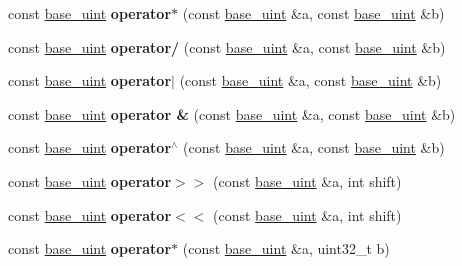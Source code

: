\begin{DoxyCompactItemize}
const \mbox{\hyperlink{classbase__uint}{base\+\_\+uint}} {\bfseries operator$\ast$} (const \mbox{\hyperlink{classbase__uint}{base\+\_\+uint}} \&a, const \mbox{\hyperlink{classbase__uint}{base\+\_\+uint}} \&b)
\item 
\mbox{\label{classbase__uint_a3027097ea3718db496e486d5c64a6bbd}} 
const \mbox{\hyperlink{classbase__uint}{base\+\_\+uint}} {\bfseries operator/} (const \mbox{\hyperlink{classbase__uint}{base\+\_\+uint}} \&a, const \mbox{\hyperlink{classbase__uint}{base\+\_\+uint}} \&b)
\item 
\mbox{\label{classbase__uint_af11d7776598f6633c139636314f065d6}} 
const \mbox{\hyperlink{classbase__uint}{base\+\_\+uint}} {\bfseries operator$\vert$} (const \mbox{\hyperlink{classbase__uint}{base\+\_\+uint}} \&a, const \mbox{\hyperlink{classbase__uint}{base\+\_\+uint}} \&b)
\item 
\mbox{\label{classbase__uint_aa75064c879a5c59352c31ce6884dbf83}} 
const \mbox{\hyperlink{classbase__uint}{base\+\_\+uint}} {\bfseries operator \&} (const \mbox{\hyperlink{classbase__uint}{base\+\_\+uint}} \&a, const \mbox{\hyperlink{classbase__uint}{base\+\_\+uint}} \&b)
\item 
\mbox{\label{classbase__uint_aa9c66282ad78846e8310984aeb2df49d}} 
const \mbox{\hyperlink{classbase__uint}{base\+\_\+uint}} {\bfseries operator$^\wedge$} (const \mbox{\hyperlink{classbase__uint}{base\+\_\+uint}} \&a, const \mbox{\hyperlink{classbase__uint}{base\+\_\+uint}} \&b)
\item 
\mbox{\label{classbase__uint_a9d619adcbf9ad5539f5e98f739edd15d}} 
const \mbox{\hyperlink{classbase__uint}{base\+\_\+uint}} {\bfseries operator$>$$>$} (const \mbox{\hyperlink{classbase__uint}{base\+\_\+uint}} \&a, int shift)
\item 
\mbox{\label{classbase__uint_acee16d973ae59087cd962720773f53dd}} 
const \mbox{\hyperlink{classbase__uint}{base\+\_\+uint}} {\bfseries operator$<$$<$} (const \mbox{\hyperlink{classbase__uint}{base\+\_\+uint}} \&a, int shift)
\item 
\mbox{\label{classbase__uint_a3490f0aef12712d434cda33f913b586f}} 
const \mbox{\hyperlink{classbase__uint}{base\+\_\+uint}} {\bfseries operator$\ast$} (const \mbox{\hyperlink{classbase__uint}{base\+\_\+uint}} \&a, uint32\+\_\+t b)

\end{DoxyCompactItemize}
